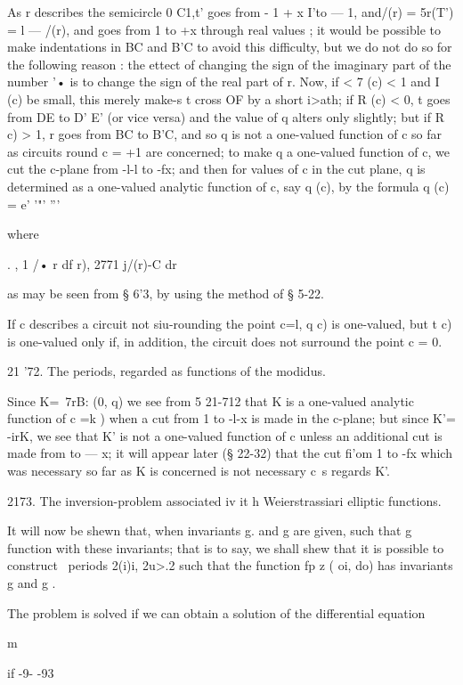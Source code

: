 As r describes the semicircle 0 C1,t' goes from - 1 + x I'to — 1,
and/(r) = 5r(T') = l — /(r), and goes from 1 to +x through real values
; it would be possible to make indentations in BC and B'C to avoid
this difficulty, but we do not do so for the following reason : the
ettect of changing the sign of the imaginary part of the number '• is
to change the sign of the real part of r. Now, if < 7 (c) < 1 and I
(c) be small, this merely make-s t cross OF by a short i>ath; if R
(c) < 0, t goes from DE to D' E' (or vice versa) and the value of q
alters only slightly; but if R c) > 1, r goes from BC to B'C, and so
q is not a one-valued function of c so far as circuits round c = +1
are concerned; to make q a one-valued function of c, we cut the
c-plane from -l-l to -fx; and then for values of c in the cut plane,
q is determined as a one-valued analytic function of c, say q (c), by
the formula q (c) = e' '"' '''

where

. , 1 /• r df r), 2771 j/(r)-C dr

as may be seen from § 6'3, by using the method of § 5-22.

If c describes a circuit not siu-rounding the point c=l, q c) is
one-valued, but t c) is one-valued only if, in addition, the circuit
does not surround the point c = 0.

21 '72. The periods, regarded as functions of the modidus.

Since K=\ 7rB: (0, q) we see from 5 21-712 that K is a one-valued
analytic function of c =k ) when a cut from 1 to -l-x is made in the
c-plane; but since K'= -irK, we see that K' is not a one-valued
function of c unless an additional cut is made from to — x; it will
appear later (§ 22-32) that the cut fi'om 1 to -fx which was necessary
so far as K is concerned is not necessary c\ s regards K'.

2173. The inversion-problem associated iv it h Weierstrassiari
elliptic functions.

It will now be shewn that, when invariants g. and g are given, such
that g %
function with these invariants; that is to say, we shall shew that it
is possible to construct \ periods 2(i)i, 2u>.2 such that the function
fp z ( oi, do) has invariants g and g .

The problem is solved if we can obtain a solution of the differential
equation

m

   if -9- -93

